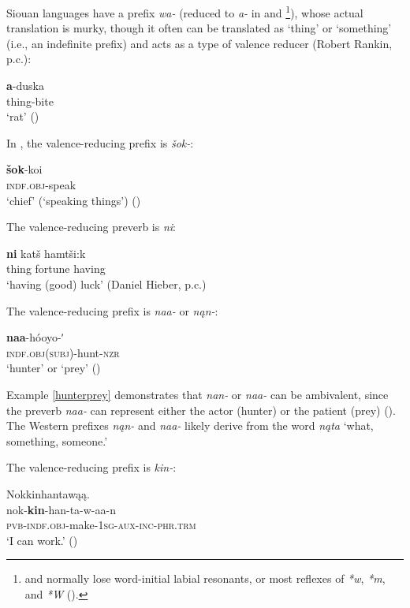\documentclass[output=paper]{LSP/langsci}
\begin{document}
	Siouan languages have a prefix \emph{wa-} (reduced to \emph{a-} in  and \footnote{ and  normally lose word-initial labial resonants, or most reflexes of \emph{*w}, \emph{*m}, and \emph{*W} (\citealt[19]{Rankin2002}).}), whose actual translation is murky, though it often can be translated as `thing' or `something' (i.e., an indefinite  prefix) and acts as a type of valence reducer (Robert Rankin, p.c.):

\ea
\gll	\textbf{a}-duska\\
		thing-bite\\
\glt	 `rat' (\citealt[186]{DorseySwanton1912})
\z

	In , the valence-reducing prefix is \emph{šok-}:

\ea
\gll	\textbf{šok}-koi\\
		\textsc{indf.obj}-speak \\

\glt	`chief' (`speaking things') (\citealt[9]{GatschetSwanton1932})
\z

The  valence-reducing preverb is \emph{ni}:

\ea
\gll	\textbf{ni} 	katš hamtši:k \\
	thing fortune having\\

\glt `having (good) luck' (Daniel Hieber, p.c.)
\z

	The  valence-reducing prefix is \emph{naa-} or \emph{nąn-}:
	
\ea\label{hunterprey}
\gll	\textbf{naa}-hóoyo-ʹ~\\
		\textsc{indf.obj(subj)}-hunt-\textsc{nzr}\\
\glt	`hunter' or `prey' (\citealt[53]{Broadwell2006})
\z

Example \ref{hunterprey} demonstrates that  \emph{nan-} or \emph{naa-} can be ambivalent, since the preverb \emph{naa-} can represent either the actor (hunter) or the patient (prey) (\citealt[53]{Broadwell2006}). The Western  prefixes \emph{nąn-} and \emph{naa-} likely derive from the word \emph{nąta} `what, something, someone.'
 
	The  valence-reducing prefix is \emph{kin-}:
	
\ea	Nokkinhantawąą.\\
\gll		nok-\textbf{kin}-han-ta-w-aa-n\\
		\textsc{pvb-indf.obj}-make-\textsc{1sg-aux-inc-phr.trm}\\
\glt	`I can work.' (\citealt[405]{Kimball2005})
\z
\end{document}
